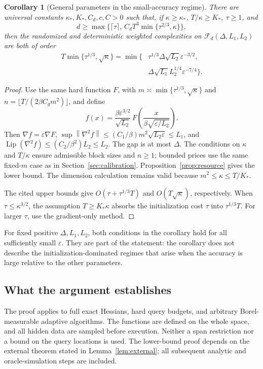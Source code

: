 \documentclass[11pt]{article}
\newtheorem{corollary}[theorem]{Corollary}
\theoremstyle{definition}
\theoremstyle{remark}
\newcommand{\eps}{\varepsilon}
\newcommand{\norm}[1]{\left\|#1\right\|}
\newcommand{\Lip}{\operatorname{Lip}}
\begin{document}
\begin{corollary}[General parameters in the small-accuracy regime]
\label{cor:parameters}
There are universal constants $\kappa_*,K_*,C_d,c,C>0$ such that,
if $\kappa\ge\kappa_*$, $T/\kappa\ge K_*$, $\tau\ge1$, and
\[
 d\ge\max\{\lceil\tau\rceil,\,
             C_dT^3\min\{\tau^{2/3},\kappa\}\},
\]
then the randomized and deterministic weighted complexities on
$\mathcal F_d(\Delta,L_1,L_2)$ are both of order
\begin{align}\label{eq:general-rate}
 T\min\{\tau^{1/3},\sqrt\kappa\}
 =\min\big\{
 &\tau^{1/3}\Delta\sqrt{L_2}\eps^{-3/2},\nonumber\\[-0.3em]
 &\Delta\sqrt{L_1}L_2^{1/4}\eps^{-7/4}
 \big\}.
\end{align}
\end{corollary}
\begin{proof}
Use the same hard function $F$, with
$m\asymp\min\{\tau^{1/3},\sqrt\kappa\}$ and
$n=\lfloor T/(2\beta C_gm^2)\rfloor$, and define
\[
 f(x)=\frac{\beta\eps^{3/2}}{\sqrt{L_2}}\,
 F\!\left(\frac{x}{\beta\sqrt{\eps/L_2}}\right).
\]
Then $\nabla f=\eps\nabla F$,
$\sup\norm{\nabla^2f}\le(C_1/\beta)m^2\sqrt{L_2\eps}\le L_1$,
and $\Lip(\nabla^2f)\le(C_2/\beta^2)L_2\le L_2$.
The gap is at most $\Delta$. The conditions on $\kappa$ and $T/\kappa$
ensure admissible block sizes and $n\ge1$; bounded prices use the same
fixed-$m$ case as in Section~\ref{sec:calibration}.
Proposition~\ref{prop:resource} gives the lower bound.
The dimension calculation remains valid because $m^2\le\kappa\le T/K_*$.

The cited upper bounds give
$O(\tau+\tau^{1/3}T)$ and $O(T\sqrt\kappa)$, respectively.
When $\tau\le\kappa^{3/2}$, the assumption $T\ge K_*\kappa$
absorbs the initialization cost $\tau$ into $\tau^{1/3}T$.
For larger $\tau$, use the gradient-only method.
\end{proof}

For fixed positive $\Delta,L_1,L_2$, both conditions in the corollary
hold for all sufficiently small $\eps$. They are part of the statement:
the corollary does not describe the initialization-dominated regimes
that arise when the accuracy is large relative to the other parameters.

\subsection{What the argument establishes}
The proof applies to full exact Hessians, hard query budgets, and
arbitrary Borel-measurable adaptive algorithms. The functions are defined
on the whole space, and all hidden data are sampled before execution.
Neither a span restriction nor a bound on the query locations is used.
The lower-bound proof depends on the external theorem stated in
Lemma~\ref{lem:external}; all subsequent analytic and oracle-simulation
steps are included.
\end{document}
